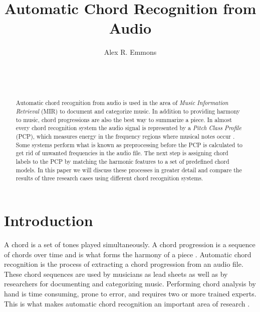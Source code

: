 \documentclass{sig-alternate}
\begin{document}

\title{Automatic Chord Recognition from Audio}


\author{
\alignauthor
Alex R. Emmons\\
	\\
	\\
	\\
}

\maketitle
\begin{abstract}
Automatic chord recognition from audio is used in the area of \textit{Music Information Retrieval} (MIR) to document and categorize music. In addition to providing harmony to music, chord progressions are also the best way to summarize a piece. In almost every chord recognition system the audio signal is represented by a \textit{Pitch Class Profile} (PCP), which measures energy in the frequency regions where musical notes occur \cite{Morman:2006}. Some systems perform what is known as preprocessing before the PCP is calculated to get rid of unwanted frequencies in the audio file. The next step is assigning chord labels to the PCP by matching the harmonic features to a set of predefined chord models. In this paper we will discuss these processes in greater detail and compare the results of three research cases using different chord recognition systems.
\end{abstract}


\section{Introduction}
A chord is a set of tones played simultaneously. A chord progression is a sequence of chords over time and is what forms the harmony of a piece \cite{Lee:2006}. Automatic chord recognition is the process of extracting a chord progression from an audio file. These chord sequences are used by musicians as lead sheets as well as by researchers for documenting and categorizing music. Performing chord analysis by hand is time consuming, prone to error, and requires two or more trained experts. This is what makes automatic chord recognition an important area of research \cite{McVicar:2014}.
\end{document}
